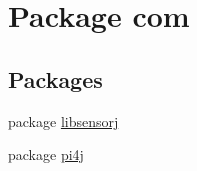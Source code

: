 \hypertarget{namespacecom}{}\section{Package com}
\label{namespacecom}
\subsection*{Packages}
\begin{DoxyCompactItemize}
\item 
package \hyperlink{namespacecom_1_1libsensorj}{libsensorj}
\item 
package \hyperlink{namespacecom_1_1pi4j}{pi4j}
\end{DoxyCompactItemize}
